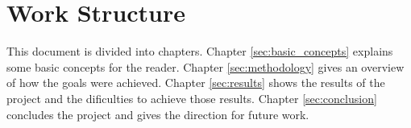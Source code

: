 \section*{Work Structure}

This document is divided into chapters. Chapter \ref{sec:basic_concepts} explains some basic concepts for the reader. Chapter \ref{sec:methodology} gives an overview of how the goals were achieved. Chapter \ref{sec:results} shows the results of the project and the dificulties to achieve those results. Chapter \ref{sec:conclusion} concludes the project and gives the direction for future work.
